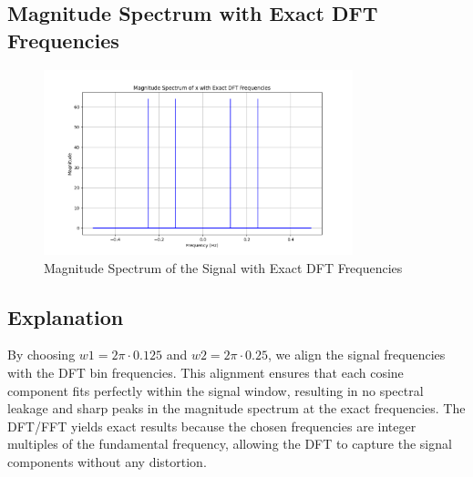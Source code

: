 \subsection*{Magnitude Spectrum with Exact DFT Frequencies}
\begin{figure}[h]
    \centering
    \includegraphics[width=0.8\textwidth]{fig/ex5_d_magnitude_spectrum_exact.png}
    \caption{Magnitude Spectrum of the Signal with Exact DFT Frequencies}
    \label{fig:ex5_d_magnitude_spectrum_exact}
\end{figure}

\subsection*{Explanation}
By choosing \( w1 = 2 \pi \cdot 0.125 \) and \( w2 = 2 \pi \cdot 0.25 \), we align the signal frequencies with the DFT bin frequencies. This alignment ensures that each cosine component fits perfectly within the signal window, resulting in no spectral leakage and sharp peaks in the magnitude spectrum at the exact frequencies. The DFT/FFT yields exact results because the chosen frequencies are integer multiples of the fundamental frequency, allowing the DFT to capture the signal components without any distortion.
